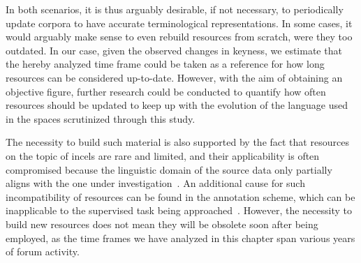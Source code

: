 \documentclass[11pt]{article}
\begin{document}
In both scenarios, it is thus arguably desirable, if not necessary, to periodically update corpora to have accurate terminological representations. In some cases, it would arguably make sense to even rebuild resources from scratch, were they too outdated. In our case, given the observed changes in keyness, we estimate that the hereby analyzed time frame could be taken as a reference for how long resources can be considered up-to-date. However, with the aim of obtaining an objective figure, further research could be conducted to quantify how often resources should be updated to keep up with the evolution of the language used in the spaces scrutinized through this study.

The necessity to build such material is also supported by the fact that resources on the topic of incels are rare and limited, and their applicability is often compromised because the linguistic domain of the source data only partially aligns with the one under investigation~\cite{pelzer-2021-toxic-language-incel-communities}. An additional cause for such incompatibility of resources can be found in the annotation scheme, which can be inapplicable to the supervised task being approached~\cite{zhou-2022-automated-hs-detection}. However, the necessity to build new resources does not mean they will be obsolete soon after being employed, as the time frames we have analyzed in this chapter span various years of forum activity.
\end{document}
